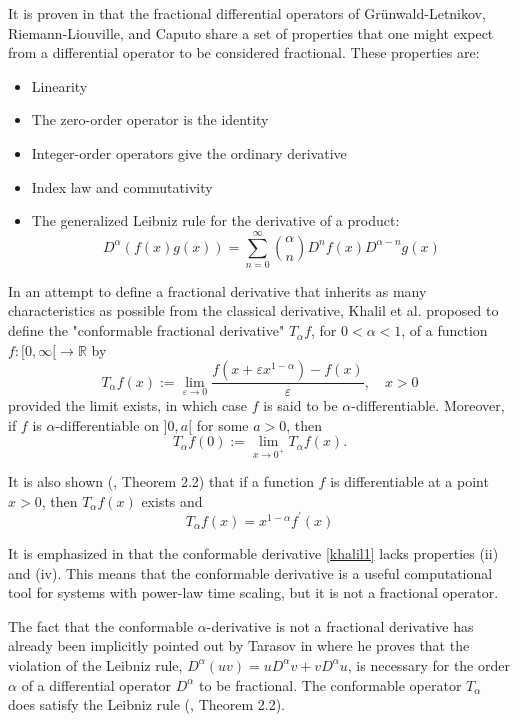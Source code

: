 \documentclass[preprint,12pt]{elsarticle}
\begin{document}
It is proven in \cite{Ortigueira2} that the fractional differential operators of Grünwald-Letnikov, Riemann-Liouville, and Caputo share a set of properties that one might expect from a differential operator to be considered fractional. These properties are:
\begin{itemize}
\item[(i)] Linearity
\item[(ii)] The zero-order operator is the identity
\item[(iii)] Integer-order operators give the ordinary derivative
\item[(iv)] Index law and commutativity
\item[(v)] The generalized Leibniz rule for the derivative of a product:
$$
D^\alpha(f(x) g(x))=\sum_{n=0}^{\infty}\binom{\alpha}{n} D^n f(x) D^{\alpha-n} g(x)
$$
\end{itemize}

In an attempt to define a fractional derivative that inherits as many characteristics as possible from the classical derivative, Khalil et al. \cite{3} proposed to define the "conformable fractional derivative" $T_\alpha f$, for $0<\alpha<1$, of a function $f:[0, \infty[\longrightarrow \mathbb{R}$ by
\begin{equation}\label{khalil1}
T_\alpha f(x):=\lim _{\varepsilon \rightarrow 0} \frac{f\left(x+\varepsilon x^{1-\alpha}\right)-f(x)}{\varepsilon}, \quad x>0
\end{equation}
provided the limit exists, in which case $f$ is said to be $\alpha$-differentiable. Moreover, if $f$ is $\alpha$-differentiable on $] 0, a[$ for some $a>0$, then
 $$T_\alpha f(0):=\lim _{x \rightarrow 0^{+}} T_\alpha f(x).$$

It is also shown (\cite{3}, Theorem 2.2) that if a function $f$ is differentiable at a point $x>0$, then $T_\alpha f(x)$ exists and
\begin{equation}\label{khalil2}
T_\alpha f(x)=x^{1-\alpha} f^{\prime}(x)
\end{equation}

It is emphasized in \cite{Ortigueira2} that the conformable derivative \eqref{khalil1} lacks properties (ii) and (iv). This means that the conformable derivative is a useful computational tool for systems with power-law time scaling, but it is not a fractional operator.

The fact that the conformable $\alpha$-derivative is not a fractional derivative has already been implicitly pointed out by Tarasov in \cite{Tarasov} where he proves that the violation of the Leibniz rule, $D^{\alpha}(uv) = u D^{\alpha}v + vD^{\alpha} u $, is necessary for the order $\alpha$ of a differential operator $ D^{\alpha} $ to be fractional. The conformable operator $T_\alpha$ does satisfy the Leibniz rule (\cite{3}, Theorem 2.2).
\end{document}

